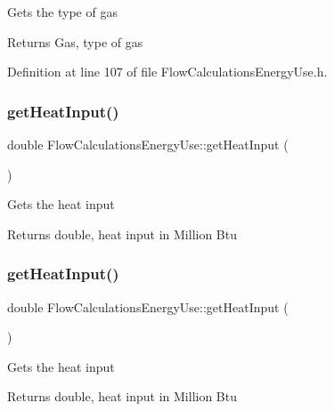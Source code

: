 Gets the type of gas

\begin{DoxyReturn}{Returns}
Gas, type of gas 
\end{DoxyReturn}


Definition at line 107 of file Flow\+Calculations\+Energy\+Use.\+h.

\mbox{\label{class_flow_calculations_energy_use_af2d2196911d4784d72b14dff83295b19}} 
\subsubsection{\texorpdfstring{get\+Heat\+Input()}{getHeatInput()}\hspace{0.1cm}{\footnotesize\ttfamily [1/3]}}
{\footnotesize\ttfamily double Flow\+Calculations\+Energy\+Use\+::get\+Heat\+Input (\begin{DoxyParamCaption}{ }\end{DoxyParamCaption})}

Gets the heat input

\begin{DoxyReturn}{Returns}
double, heat input in Million Btu 
\end{DoxyReturn}
\mbox{\label{class_flow_calculations_energy_use_af2d2196911d4784d72b14dff83295b19}} 
\subsubsection{\texorpdfstring{get\+Heat\+Input()}{getHeatInput()}\hspace{0.1cm}{\footnotesize\ttfamily [2/3]}}
{\footnotesize\ttfamily double Flow\+Calculations\+Energy\+Use\+::get\+Heat\+Input (\begin{DoxyParamCaption}{ }\end{DoxyParamCaption})}

Gets the heat input

\begin{DoxyReturn}{Returns}
double, heat input in Million Btu 
\end{DoxyReturn}


